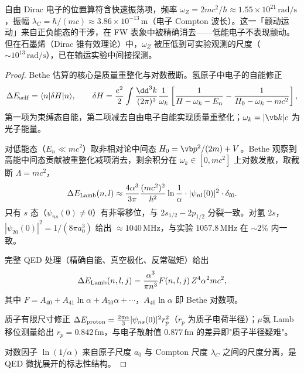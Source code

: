 自由 Dirac 电子的位置算符含快速振荡项，频率 $\omega_Z=2mc^2/\hbar\approx1.55\times10^{21}\,\mathrm{rad/s}$，振幅 $\lambda_C=\hbar/(mc)\approx3.86\times10^{-13}\,\mathrm{m}$（电子 Compton 波长）。这一「颤动运动」来自正负能态的干涉，在 FW 表象中被精确消去——低能电子不表现颤动。但在石墨烯（Dirac 锥有效理论）中，$\omega_Z$ 被压低到可实验观测的尺度（$\sim10^{13}\,\mathrm{rad/s}$），已在输运实验中间接探测。

\begin{proof}
Bethe 估算的核心是质量重整化与对数截断。氢原子中电子的自能修正
\begin{equation*}
  \Delta E_{\rm self}=\langle n|\delta H|n\rangle,\qquad\delta H=\frac{e^2}{2}\int\frac{\dd^3k}{(2\pi)^3}\frac{1}{\omega_k}\left[\frac{1}{H-\omega_k-E_n}-\frac{1}{H_0-\omega_k-mc^2}\right],
\end{equation*}
第一项为束缚态自能，第二项减去自由电子自能实现质量重整化；\(\omega_k=|\vb k|c\) 为光子能量。

对低能态（\(E_n\ll mc^2\)）取非相对论中间态 \(H_0=\vb p^2/(2m)+V\)。Bethe 观察到高能中间态贡献被重整化减项消去，剩余积分在 \(\omega_k\in[0,mc^2]\) 上对数发散，取截断 \(\Lambda=mc^2\)，
\begin{equation*}
  \Delta E_{\rm Lamb}(n,l)\approx\frac{4\alpha^3}{3\pi}\frac{(mc^2)^2}{\hbar^2}\ln\frac{1}{\alpha}\cdot|\psi_{nl}(0)|^2\cdot\delta_{l0}.
\end{equation*}
只有 \(s\) 态（\(\psi_{ns}(0)\ne0\)）有非零移位，与 \(2s_{1/2}-2p_{1/2}\) 分裂一致。对氢 \(2s\)，\(|\psi_{20}(0)|^2=1/(8\pi a_0^3)\) 给出 \(\approx1040\,\mathrm{MHz}\)，与实验 \(1057.8\,\mathrm{MHz}\) 在 \(\sim2\%\) 内一致。

完整 QED 处理（精确自能、真空极化、反常磁矩）给出
\begin{equation*}
  \Delta E_{\rm Lamb}(n,l,j)=\frac{\alpha^3}{\pi n^3}F(n,l,j)\,Z^4\alpha^2 mc^2,
\end{equation*}
其中 \(F=A_{40}+A_{41}\ln\alpha+A_{50}\alpha+\cdots\)，\(A_{40}\ln\alpha\) 即 Bethe 对数项。

质子有限尺寸修正 \(\Delta E_{\rm proton}=\frac{2\pi\alpha}{3}|\psi_{ns}(0)|^2 r_p^2\)（\(r_p\) 为质子电荷半径）；\(\mu\)氢 Lamb 移位测量给出 \(r_p=0.842\,\mathrm{fm}\)，与电子散射值 \(0.877\,\mathrm{fm}\) 的差异即"质子半径疑难"。

对数因子 \(\ln(1/\alpha)\) 来自原子尺度 \(a_0\) 与 Compton 尺度 \(\lambda_C\) 之间的尺度分离，是 QED 微扰展开的标志性结构。

\end{proof}

